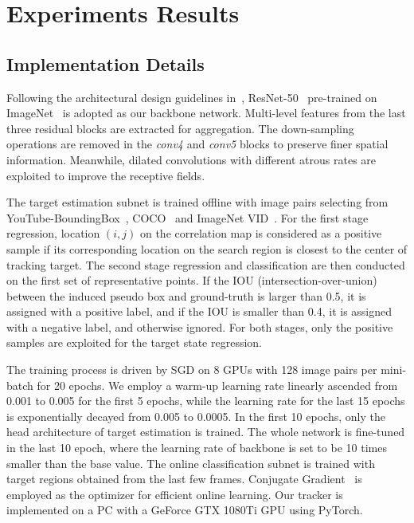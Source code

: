 \documentclass[runningheads]{llncs}
\begin{document}
\section{Experiments Results}

\subsection{Implementation Details}

Following the architectural design guidelines in~\cite{CIR}, ResNet-50~\cite{resnet50}
pre-trained on ImageNet~\cite{imagenet} is adopted as our backbone network.
Multi-level features from the last three residual blocks are extracted
for aggregation. The down-sampling operations are removed in the
\emph{conv4} and \emph{conv5} blocks to preserve finer spatial
information. Meanwhile, dilated convolutions with different
atrous rates are exploited to improve the receptive fields.

The target estimation subnet is trained offline with image pairs
selecting from YouTube-BoundingBox~\cite{youtubebb}, COCO~\cite{coco} and ImageNet
VID~\cite{imagenet}. For the first stage regression, location $\left(i,j\right)$ on the correlation map is considered as a positive sample
if its corresponding location on the search region is closest to the center of tracking target.
The second stage regression and
classification are then conducted on the first set of representative points. If the IOU (intersection-over-union)
between the induced pseudo box and ground-truth is larger than 0.5, it is assigned with a positive label, and
if the IOU is smaller than 0.4, it is assigned with a negative label, and otherwise ignored. For both stages,
only the positive samples are exploited for the target state regression.

The training process is driven by SGD on 8 GPUs with 128
image pairs per mini-batch for 20 epochs. We employ a warm-up learning
rate linearly ascended from 0.001 to 0.005 for the first 5 epochs, while
the learning rate for the last 15 epochs is exponentially decayed from
0.005 to 0.0005. In the first 10 epochs, only the head architecture of
target estimation is trained. The whole network is fine-tuned in the
last 10 epoch, where the learning rate of backbone is set to be 10 times
smaller than the base value. The online classification subnet is trained
with target regions obtained from the last few frames. Conjugate
Gradient~\cite{atom} is employed as the optimizer for efficient online learning. Our
tracker is implemented on a PC with a GeForce GTX 1080Ti GPU using
PyTorch.
\end{document}
